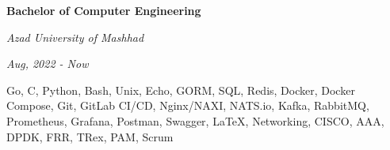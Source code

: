 \documentclass{engineercv}
\begin{document}
\begin{minipage}{\textwidth}
  \begin{multicols}{2}
    \begin{minipage}{0.5\textwidth}
      \textbf{Bachelor of Computer Engineering}

      \textit{Azad University of Mashhad}

      \textit{Aug, 2022 - Now}
    \end{minipage}
    \columnbreak
    \begin{minipage}{0.5\textwidth}
      Go, C, Python, Bash, Unix, Echo, GORM, SQL, Redis, Docker, Docker Compose, Git, GitLab CI/CD,
      Nginx/NAXI, NATS.io, Kafka, RabbitMQ, Prometheus, Grafana, Postman, Swagger, \LaTeX, Networking,
      CISCO, AAA, DPDK, FRR, TRex, PAM, Scrum
    \end{minipage}
  \end{multicols}
\end{minipage}
\end{document}
